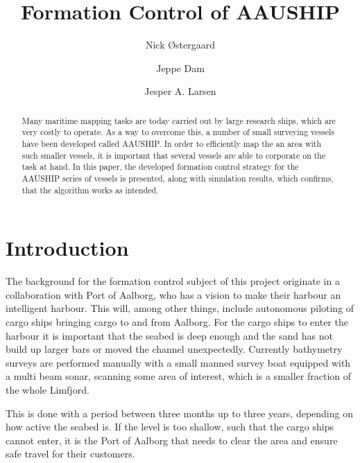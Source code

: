 \documentclass[a4paper,conference]{IEEEtran}
\begin{document}
\title{\vspace{-2cm}Formation Control of AAUSHIP}
\author{Nick Østergaard \and Jeppe Dam \and Jesper A. Larsen}
\maketitle


\begin{abstract}
Many maritime mapping tasks are today carried out by large research ships, which are very costly to operate. As a way to overcome this, a number of small surveying vessels have been developed called AAUSHIP. In order to efficiently map the an area with such smaller vessels, it is important that several vessels are able to corporate on the task at hand. In this paper, the developed formation control strategy for the AAUSHIP series of vessels is presented, along with simulation results, which confirms, that the algorithm works as intended.
\end{abstract}
\vspace{-3mm}
\section{Introduction}
The background for the formation control subject of this project
originate in a collaboration with Port of Aalborg, who has a vision to
make their harbour an intelligent harbour. This will, among other
things, include autonomous piloting of cargo ships bringing cargo to and from
Aalborg. For the cargo ships to enter the harbour it is important that
the seabed is deep enough and the sand has not build up larger bars or
moved the channel unexpectedly.  Currently bathymetry surveys are
performed manually with a small manned survey boat equipped with a
multi beam sonar, scanning some area of interest, which is a smaller
fraction of the whole Limfjord.

This is done with a period between three months up to three years,
depending on how active the seabed is. If the level is too shallow,
such that the cargo ships cannot enter, it is the Port of Aalborg that
needs to clear the area and ensure safe travel for their customers.
\end{document}
